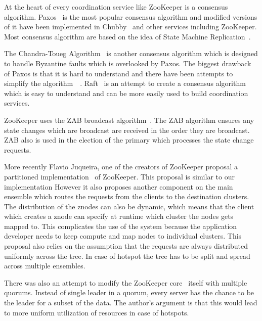 At the heart of every coordination service like ZooKeeper is a consensus algorithm. Paxos~\cite{lamport2001paxos} is the most popular consensus algorithm and modified versions of it have been implemented in Chubby~\cite{burrows2006chubby} and other services including ZooKeeper. Most consensus algorithm are based on the idea of State Machine Replication~\cite{schneider1990implementing}. 

The Chandra-Toueg Algorithm~\cite{Chandra:1996:UFD:226643.226647} is another consensus algorithm which is designed to handle Byzantine faults which is overlooked by Paxos. The biggest drawback of Paxos is that it is hard to understand and there have been attempts to simplify the algorithm~\cite{chandra2007paxos}~\cite{lampson2001abcd}. Raft~\cite{ongaro2013search} is an attempt to create a consensus algorithm which is easy to understand and can be more easily used to build coordination services.

ZooKeeper uses the ZAB broadcast algorithm~\cite{junqueira2011zab}. The ZAB algorithm ensures any state changes which are broadcast are received in the order they are broadcast. ZAB also is used in the election of the primary which processes the state change requests.

More recently Flavio Juqueira, one of the creators of ZooKeeper proposal a partitioned implementation~\cite{junqueira2010partitioned} of ZooKeeper. This proposal is similar to our implementation However it also proposes another component on the main ensemble which routes the requests from the clients to the destination clusters. The distribution of the znodes can also be dynamic, which means that the client which creates a znode can specify at runtime which cluster the nodes gets mapped to. This complicates the use of the system because the application developer needs to keep compute and map nodes to individual clusters. This proposal also relies on the assumption that the requests are always distributed uniformly across the tree. In case of hotspot the tree has to be split and spread across multiple ensembles.

There was also an attempt to modify the ZooKeeper core~\cite{biligiri2014multiquorum} itself with multiple quorums. Instead of single leader in a quorum, every server has the chance to be the leader for a subset of the data. The author's argument is that this would lead to more uniform utilization of resources in case of hotspots. 
